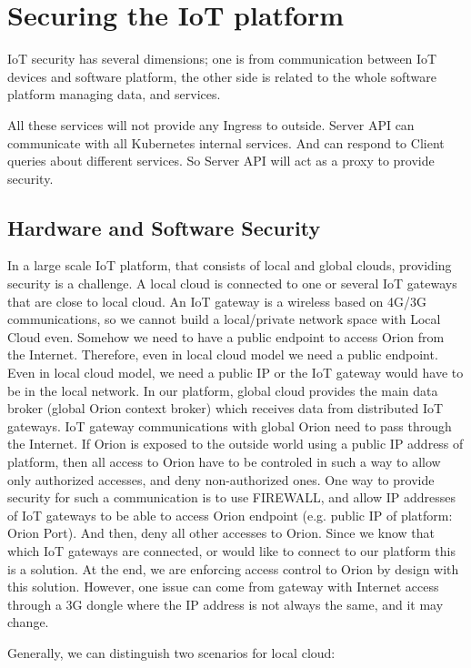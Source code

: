 \section{Securing the IoT platform}
IoT security has several dimensions; one is from communication between IoT devices and software platform, the other side is related to the whole software platform managing data, and services.

All these services will not provide any Ingress to outside. Server API can communicate with all Kubernetes internal services. And can respond to Client queries about different services. So Server API will act as a proxy to provide security.

\subsection{Hardware and Software Security}
In a large scale IoT platform, that consists of local and global clouds, providing security is a challenge. A local cloud is connected to one or several IoT gateways that are close to local cloud. 
An IoT gateway is a wireless based on 4G/3G communications, so we cannot build a local/private network space with Local Cloud even. Somehow we need to have a public endpoint to access Orion from the Internet. Therefore, even in local cloud model we need a public endpoint. Even in local cloud model, we need a public IP or the IoT gateway would have to be in the local network.
In our platform, global cloud provides the main data broker (global Orion context broker) which receives data from distributed IoT gateways. IoT gateway communications with global Orion need to pass through the Internet. If Orion is exposed to the outside world using a public IP address of platform, then all access to Orion have to be controled in such a way to allow only authorized accesses, and deny non-authorized ones.
One way to provide security for such a communication is to use FIREWALL, and allow IP addresses of IoT gateways to be able to access Orion endpoint (e.g. public IP of platform: Orion Port). And then, deny all other accesses to Orion. Since we know that which IoT gateways are connected, or would like to connect to our platform this is a solution. At the end, we are enforcing access control to Orion by design with this solution. However, one issue can come from gateway with Internet access through a 3G dongle where the IP address is not always the same, and it may change. 

Generally, we can distinguish two scenarios for local cloud:

